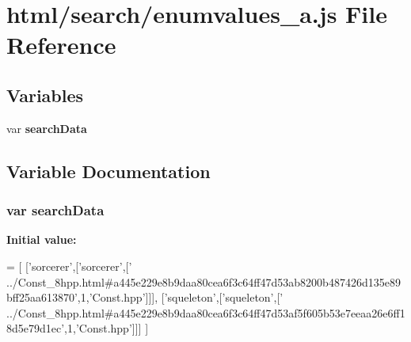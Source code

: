 \section{html/search/enumvalues\-\_\-a.js File Reference}
\label{enumvalues__a_8js}
\subsection*{Variables}
\begin{DoxyCompactItemize}
\item 
var {\bf search\-Data}
\end{DoxyCompactItemize}


\subsection{Variable Documentation}
\subsubsection[{search\-Data}]{\setlength{\rightskip}{0pt plus 5cm}var search\-Data}\label{enumvalues__a_8js_ad01a7523f103d6242ef9b0451861231e}
{\bfseries Initial value\-:}
\begin{DoxyCode}
=
[
  [\textcolor{stringliteral}{'sorcerer'},[\textcolor{stringliteral}{'sorcerer'},[\textcolor{stringliteral}{'
      ../Const\_8hpp.html#a445e229e8b9daa80cea6f3c64ff47d53ab8200b487426d135e89bff25aa613870'},1,\textcolor{stringliteral}{'Const.hpp'}]]],
  [\textcolor{stringliteral}{'squeleton'},[\textcolor{stringliteral}{'squeleton'},[\textcolor{stringliteral}{'
      ../Const\_8hpp.html#a445e229e8b9daa80cea6f3c64ff47d53af5f605b53e7eeaa26e6ff18d5e79d1ec'},1,\textcolor{stringliteral}{'Const.hpp'}]]]
]
\end{DoxyCode}
